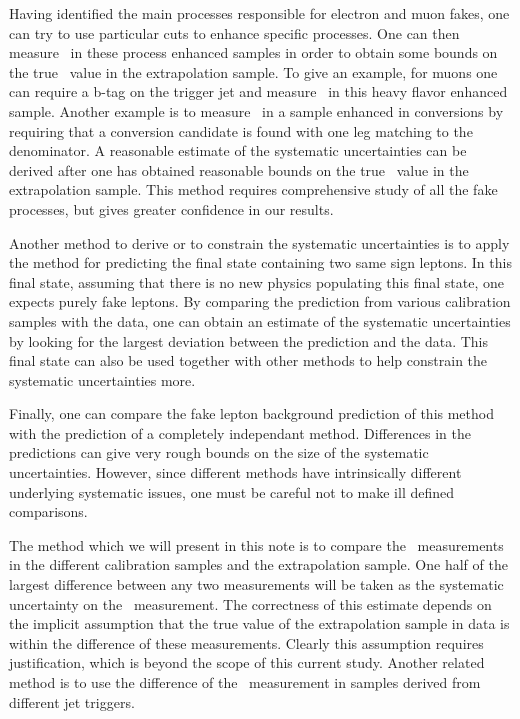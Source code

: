 \documentclass{cmspaper}
\begin{document}
Having identified the main processes responsible for electron and muon fakes, one can try to use particular cuts to enhance specific processes. One can then measure \epsilonFake~in these process enhanced samples in order to obtain some bounds on the true \epsilonFake~value in the extrapolation sample. To give an example, for muons one can require a b-tag on the trigger jet and measure \epsilonFake~in this heavy flavor enhanced sample. Another example is to measure \epsilonFake~in a sample enhanced in conversions by requiring that a conversion candidate is found with one leg matching to the denominator. A reasonable estimate of the systematic uncertainties can be derived after one has obtained reasonable bounds on the true \epsilonFake~value in the extrapolation sample. This method requires comprehensive study of all the fake processes, but gives greater confidence in our results.

Another method to derive or to constrain the systematic uncertainties is to apply the method for predicting the final state containing two same sign leptons. In this final state, assuming that there is no new physics populating this final state, one expects purely fake leptons. By comparing the prediction from various calibration samples with the data, one can obtain an estimate of the systematic uncertainties by looking for the largest deviation between the prediction and the data. This final state can also be used together with other methods to help constrain the systematic uncertainties more.

Finally, one can compare the fake lepton background prediction of this method with the prediction of a completely independant method. Differences in the predictions can give very rough bounds on the size of the systematic uncertainties. However, since different methods have intrinsically different underlying systematic issues, one must be careful not to make ill defined comparisons.

The method which we will present in this note is to compare the \epsilonFake~measurements in the different calibration samples and the extrapolation sample. One half of the largest difference between any two measurements will be taken as the systematic uncertainty on the \epsilonFake~measurement. The correctness of this estimate depends on the implicit assumption that the true \epsilonFake value of the extrapolation sample in data is within the difference of these measurements. Clearly this assumption requires justification, which is beyond the scope of this current study.  Another related method is to use the difference of the \epsilonFake~measurement in samples derived from different jet triggers. 
\end{document}
